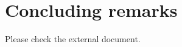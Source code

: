 \chapter{Concluding remarks}
\label{concluding_remarks}


Please check the external document. 









